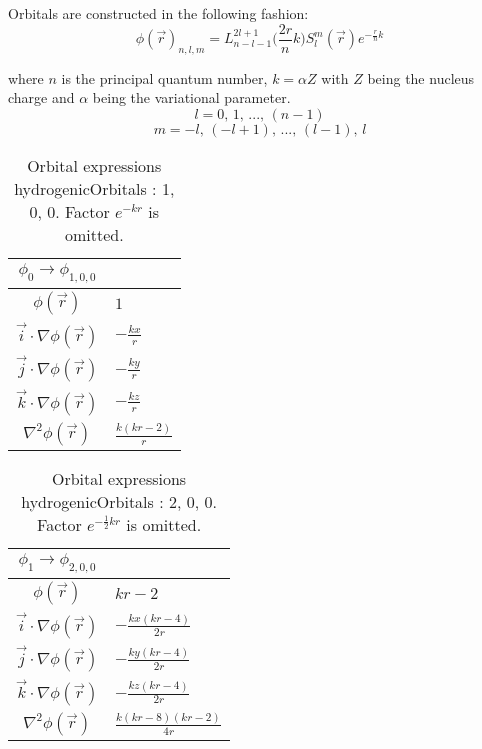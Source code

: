 % 
% 
% 
% 


Orbitals are constructed in the following fashion:
\begin{equation*}
\phi(\vec r)_{n, l, m} = L_{n - l - 1}^{2l + 1}\Big(\frac{2r}{n}k\Big)S_{l}^{m}(\vec r)e^{-\frac{r}{n}k}
\end{equation*}   

where $n$ is the principal quantum number, $k = \alpha Z$ with $Z$ being the nucleus charge and 
$\alpha$ being the variational parameter.
$$l = 0,\, 1,\, ...,\, (n-1)$$ 
$$m = -l,\, (-l + 1),\, ...,\, (l-1),\, l$$
  
\newpage



\begin{table}
\begin{center}
\begin{tabular}{c|l}
$\phi_{0} \rightarrow \phi_{1, 0, 0}$\\
\hline
$\phi(\vec r)$ & $1$\\
\hline
$\vec i\cdot \nabla \phi(\vec r)$ & $- \frac{k x}{r}$\\
$\vec j\cdot \nabla \phi(\vec r)$ & $- \frac{k y}{r}$\\
$\vec k\cdot \nabla \phi(\vec r)$ & $- \frac{k z}{r}$\\
\hline
$\nabla^2 \phi(\vec r)$ & $\frac{k \left(k r -2\right)}{r}$\\
\end{tabular}
\caption{Orbital expressions hydrogenicOrbitals : 1, 0, 0. Factor $e^{- k r}$ is omitted.}
\end{center}
\end{table}


\begin{table}
\begin{center}
\begin{tabular}{c|l}
$\phi_{1} \rightarrow \phi_{2, 0, 0}$\\
\hline
$\phi(\vec r)$ & $k r -2$\\
\hline
$\vec i\cdot \nabla \phi(\vec r)$ & $- \frac{k x \left(k r -4\right)}{2 r}$\\
$\vec j\cdot \nabla \phi(\vec r)$ & $- \frac{k y \left(k r -4\right)}{2 r}$\\
$\vec k\cdot \nabla \phi(\vec r)$ & $- \frac{k z \left(k r -4\right)}{2 r}$\\
\hline
$\nabla^2 \phi(\vec r)$ & $\frac{k \left(k r -8\right) \left(k r -2\right)}{4 r}$\\
\end{tabular}
\caption{Orbital expressions hydrogenicOrbitals : 2, 0, 0. Factor $e^{- \frac{1}{2} k r}$ is omitted.}
\end{center}
\end{table}


